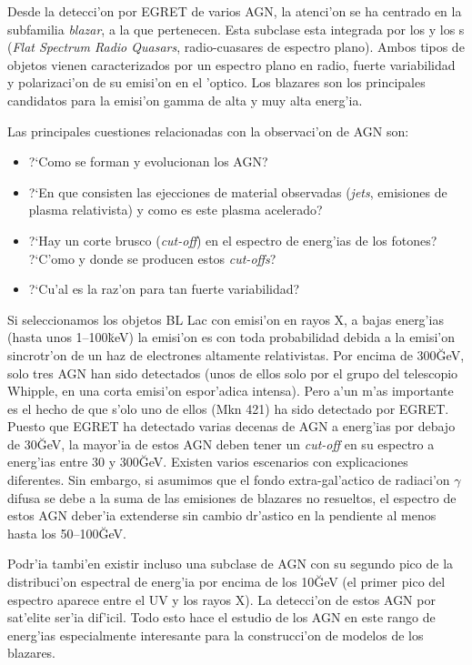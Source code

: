 
Desde la detecci'on por EGRET de varios AGN, la atenci'on se ha
centrado en la subfamilia \emph{blazar}, a la que pertenecen.  Esta
subclase esta integrada por los \emph{} y los
s (\emph{Flat Spectrum Radio Quasars}, radio-cuasares de
espectro plano). Ambos tipos de objetos vienen caracterizados por un
espectro plano en radio, fuerte variabilidad y polarizaci'on de su
emisi'on en el 'optico. Los blazares son los principales candidatos
para la emisi'on gamma de alta y muy alta energ'ia.

Las principales cuestiones relacionadas con la observaci'on de AGN
son:
%
\begin{itemize}
\item ?`Como se forman y evolucionan los AGN?
\item ?`En que consisten las ejecciones de material observadas
  (\emph{jets}, emisiones de plasma relativista) y como es este plasma
  acelerado?
\item ?`Hay un corte brusco (\emph{cut-off}) en el espectro de
  energ'ias de los fotones? ?`C'omo y donde se producen estos
  \emph{cut-offs}?
\item ?`Cu'al es la raz'on para tan fuerte variabilidad?
\end{itemize}

Si seleccionamos los objetos BL Lac con emisi'on en rayos X, a bajas
energ'ias (hasta unos 1--100\u{keV}) la emisi'on es con toda
probabilidad debida a la emisi'on sincrotr'on de un haz de electrones
altamente relativistas. Por encima de 300\u{GeV}, solo tres AGN han
sido detectados (unos de ellos solo por el grupo del telescopio
Whipple, en una corta emisi'on espor'adica intensa). Pero a'un m'as
importante es el hecho de que s'olo uno de ellos (Mkn 421) ha sido
detectado por EGRET. Puesto que EGRET ha detectado varias decenas de
AGN a energ'ias por debajo de 30\u{GeV}, la mayor'ia de estos AGN
deben tener un \emph{cut-off} en su espectro a energ'ias entre 30 y
300\u{GeV}. Existen varios escenarios con explicaciones diferentes.
Sin embargo, si asumimos que el fondo extra-gal'actico de radiaci'on
$\gamma$ difusa se debe a la suma de las emisiones de blazares no
resueltos, el espectro de estos AGN deber'ia extenderse sin cambio
dr'astico en la pendiente al menos hasta los 50--100\u{GeV}.

Podr'ia tambi'en existir incluso una subclase de AGN con su segundo
pico de la distribuci'on espectral de energ'ia por encima de los
10\u{GeV} (el primer pico del espectro aparece entre el UV y los rayos
X). La detecci'on de estos AGN por sat'elite ser'ia dif'icil. Todo
esto hace el estudio de los AGN en este rango de energ'ias
especialmente interesante para la construcci'on de modelos de los
blazares.

